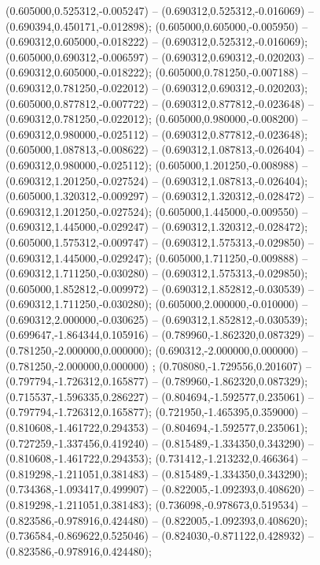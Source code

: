  (0.605000,0.525312,-0.005247) -- (0.690312,0.525312,-0.016069) -- (0.690394,0.450171,-0.012898);
 (0.605000,0.605000,-0.005950) -- (0.690312,0.605000,-0.018222) -- (0.690312,0.525312,-0.016069);
 (0.605000,0.690312,-0.006597) -- (0.690312,0.690312,-0.020203) -- (0.690312,0.605000,-0.018222);
 (0.605000,0.781250,-0.007188) -- (0.690312,0.781250,-0.022012) -- (0.690312,0.690312,-0.020203);
 (0.605000,0.877812,-0.007722) -- (0.690312,0.877812,-0.023648) -- (0.690312,0.781250,-0.022012);
 (0.605000,0.980000,-0.008200) -- (0.690312,0.980000,-0.025112) -- (0.690312,0.877812,-0.023648);
 (0.605000,1.087813,-0.008622) -- (0.690312,1.087813,-0.026404) -- (0.690312,0.980000,-0.025112);
 (0.605000,1.201250,-0.008988) -- (0.690312,1.201250,-0.027524) -- (0.690312,1.087813,-0.026404);
 (0.605000,1.320312,-0.009297) -- (0.690312,1.320312,-0.028472) -- (0.690312,1.201250,-0.027524);
 (0.605000,1.445000,-0.009550) -- (0.690312,1.445000,-0.029247) -- (0.690312,1.320312,-0.028472);
 (0.605000,1.575312,-0.009747) -- (0.690312,1.575313,-0.029850) -- (0.690312,1.445000,-0.029247);
 (0.605000,1.711250,-0.009888) -- (0.690312,1.711250,-0.030280) -- (0.690312,1.575313,-0.029850);
 (0.605000,1.852812,-0.009972) -- (0.690312,1.852812,-0.030539) -- (0.690312,1.711250,-0.030280);
 (0.605000,2.000000,-0.010000) -- (0.690312,2.000000,-0.030625) -- (0.690312,1.852812,-0.030539);
 (0.699647,-1.864344,0.105916) -- (0.789960,-1.862320,0.087329) -- (0.781250,-2.000000,0.000000);
 (0.690312,-2.000000,0.000000) -- (0.781250,-2.000000,0.000000) ;
 (0.708080,-1.729556,0.201607) -- (0.797794,-1.726312,0.165877) -- (0.789960,-1.862320,0.087329);
 (0.715537,-1.596335,0.286227) -- (0.804694,-1.592577,0.235061) -- (0.797794,-1.726312,0.165877);
 (0.721950,-1.465395,0.359000) -- (0.810608,-1.461722,0.294353) -- (0.804694,-1.592577,0.235061);
 (0.727259,-1.337456,0.419240) -- (0.815489,-1.334350,0.343290) -- (0.810608,-1.461722,0.294353);
 (0.731412,-1.213232,0.466364) -- (0.819298,-1.211051,0.381483) -- (0.815489,-1.334350,0.343290);
 (0.734368,-1.093417,0.499907) -- (0.822005,-1.092393,0.408620) -- (0.819298,-1.211051,0.381483);
 (0.736098,-0.978673,0.519534) -- (0.823586,-0.978916,0.424480) -- (0.822005,-1.092393,0.408620);
 (0.736584,-0.869622,0.525046) -- (0.824030,-0.871122,0.428932) -- (0.823586,-0.978916,0.424480);
